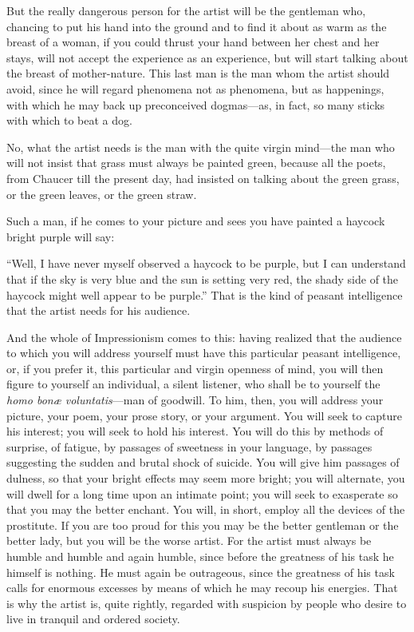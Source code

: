 But the really dangerous person for the artist will be the gentleman
who, chancing to put his hand into the ground and to find it about as
warm as the breast of a woman, if you could thrust your hand between her
chest and her stays, will not accept the experience as an experience,
but will start talking about the breast of mother-nature. This last man
is the man whom the artist should avoid, since he will regard phenomena
not as phenomena, but as happenings, with which he may back up
preconceived dogmas---as, in fact, so many sticks with which to beat a
dog.

No, what the artist needs is the man with the quite virgin mind---the
man who will not insist that grass must always be painted green, because
all the poets, from Chaucer till the present day, had insisted on
talking about the green grass, or the green leaves, or the green straw.

Such a man, if he comes to your picture and sees you have painted a
haycock bright purple will say:

``Well, I have never myself observed a haycock to be purple, but I can
understand that if the sky is very blue and the sun is setting very red,
the shady side of the haycock might well appear to be purple.'' That is
the kind of peasant intelligence that the artist needs for his audience.

And the whole of Impressionism comes to this: having realized that the
audience to which you will address yourself must have this particular
peasant intelligence, or, if you prefer it, this particular and virgin
openness of mind, you will then figure to yourself an individual, a
silent listener, who shall be to yourself the \emph{homo bonæ
voluntatis}---man of goodwill. To him, then, you will address your
picture, your poem, your prose story, or your argument. You will seek to
capture his interest; you will seek to hold his interest. You will do
this by methods of surprise, of fatigue, by passages of sweetness in
your language, by passages suggesting the sudden and brutal shock of
suicide. You will give him passages of dulness, so that your bright
effects may seem more bright; you will alternate, you will dwell for a
long time upon an intimate point; you will seek to exasperate so that
you may the better enchant. You will, in short, employ all the devices
of the prostitute. If you are too proud for this you may be the better
gentleman or the better lady, but you will be the worse artist. For the
artist must always be humble and humble and again humble, since before
the greatness of his task he himself is nothing. He must again be
outrageous, since the greatness of his task calls for enormous excesses
by means of which he may recoup his energies. That is why the artist is,
quite rightly, regarded with suspicion by people who desire to live in
tranquil and ordered society.

